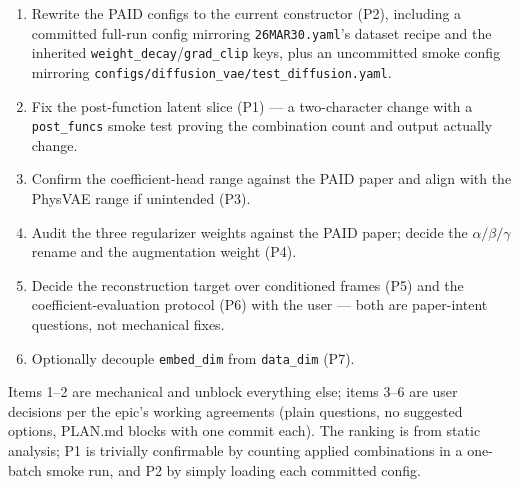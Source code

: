\documentclass[11pt,a4paper]{article}
\newcommand{\code}[1]{\texttt{#1}}
\begin{document}
\begin{enumerate}
  \item Rewrite the PAID configs to the current constructor (P2), including a
        committed full-run config mirroring \code{26MAR30.yaml}'s dataset recipe
        and the inherited \code{weight\_decay}/\code{grad\_clip} keys, plus an
        uncommitted smoke config mirroring
        \code{configs/diffusion\_vae/test\_diffusion.yaml}.
  \item Fix the post-function latent slice (P1) --- a two-character change with a
        \code{post\_funcs} smoke test proving the combination count and output
        actually change.
  \item Confirm the coefficient-head range against the PAID paper and align with
        the PhysVAE range if unintended (P3).
  \item Audit the three regularizer weights against the PAID paper; decide the
        $\alpha/\beta/\gamma$ rename and the augmentation weight (P4).
  \item Decide the reconstruction target over conditioned frames (P5) and the
        coefficient-evaluation protocol (P6) with the user --- both are
        paper-intent questions, not mechanical fixes.
  \item Optionally decouple \code{embed\_dim} from \code{data\_dim} (P7).
\end{enumerate}

Items 1--2 are mechanical and unblock everything else; items 3--6 are user
decisions per the epic's working agreements (plain questions, no suggested
options, PLAN.md blocks with one commit each). The ranking is from static
analysis; P1 is trivially confirmable by counting applied combinations in a
one-batch smoke run, and P2 by simply loading each committed config.
\end{document}
